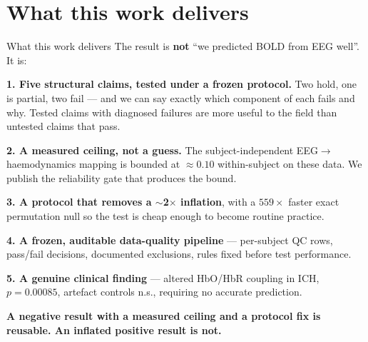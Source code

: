 \documentclass[aspectratio=169,11pt]{beamer}
\begin{document}
\section{What this work delivers}
\begin{frame}{What this work delivers}
The result is \textbf{not} ``we predicted BOLD from EEG well''. It is:

\vspace{0.5em}
\textbf{1. Five structural claims, tested under a frozen protocol.} Two hold,
one is partial, two fail --- and we can say exactly which component of each fails and
why. Tested claims with diagnosed failures are more useful to the field than
untested claims that pass.

\vspace{0.4em}
\textbf{2. A measured ceiling, not a guess.} The subject-independent
EEG$\rightarrow$haemodynamics mapping is bounded at $\approx0.10$ within-subject
on these data. We publish the reliability gate that produces the bound.

\vspace{0.4em}
\textbf{3. A protocol that removes a $\sim$2$\times$ inflation}, with a
$559\times$ faster exact permutation null so the test is cheap enough to become
routine practice.

\vspace{0.4em}
\textbf{4. A frozen, auditable data-quality pipeline} --- per-subject QC rows,
pass/fail decisions, documented exclusions, rules fixed before test performance.

\vspace{0.4em}
\textbf{5. A genuine clinical finding} --- altered HbO/HbR coupling in ICH,
$p=0.00085$, artefact controls n.s., requiring no accurate prediction.

\vspace{0.5em}
\begin{center}
\textcolor{good}{\textbf{A negative result with a measured ceiling and a protocol
fix is reusable. An inflated positive result is not.}}
\end{center}
\end{frame}
\end{document}
